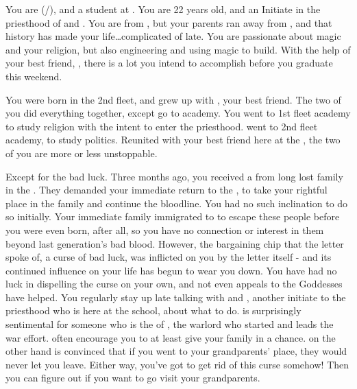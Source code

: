 \documentclass[char]{GL2020}
\begin{document}
\name{\cInitiate{}}



You are \cInitiate{\full} (\cInitiate{\they}/\cInitiate{\them}), and a student at \pSchool{}. You are 22 years old, and an Initiate in the priesthood of \cEbb{} and \cFlow{}. You are from \pShip{}, but your parents ran away from \pFarm{}, and that history has made your life\ldots complicated of late. You are passionate about magic and your religion, but also engineering and using magic to build. With the help of your best friend, \cPresident{\full}, there is a lot you intend to accomplish before you graduate this weekend.

You were born in the 2nd fleet, and grew up with \cPresident{}, your best friend. The two of you did everything together, except go to academy. You went to 1st fleet academy to study religion with the intent to enter the priesthood. \cPresident{\They} went to 2nd fleet academy, to study politics. Reunited with your best friend here at the \pSchool{}, the two of you are more or less unstoppable. 

Except for the bad luck. Three months ago, you received a \iCursedLetter{} from long lost family in the \pFarm{}. They demanded your immediate return to the \pFarm{}, to take your rightful place in the family and continue the bloodline. You had no such inclination to do so initially. Your immediate family immigrated to \pShip{} to escape these people before you were even born, after all, so you have no connection or interest in them beyond last generation’s bad blood. However, the bargaining chip that the letter spoke of, a curse of bad luck, was inflicted on you by the letter itself - and its continued influence on your life has begun to wear you down. You have had no luck in dispelling the curse on your own, and not even appeals to the Goddesses have helped. You regularly stay up late talking with \cPresident{} and \cWarlordDaughter{}, another initiate to the priesthood who is here at the school, about what to do. \cWarlordDaughter{} is surprisingly sentimental for someone who is the \cWarlordDaughter{\child} of \cLoud{\full}, the warlord who started and leads the \pShip{} war effort. \cWarlordDaughter{\They} often encourage\cWarlordDaughter{\plural} you to at least give your family in \pFarm{} a chance. \cPresident{} on the other hand is convinced that if you went to your grandparents' place, they would never let you leave. Either way, you’ve got to get rid of this curse somehow! Then you can figure out if you want to go visit your grandparents.
\end{document}
